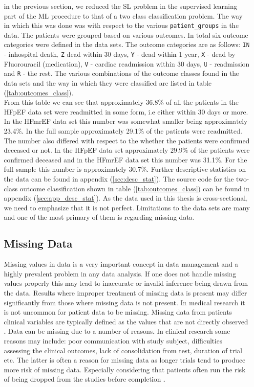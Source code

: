 \documentclass[../thesis.tex]{subfiles}
\begin{document}
\noindent in the previous section, we reduced the SL problem in the supervised learning part of the ML procedure to that of a two class classification problem. The way in which this was done was with respect to the various \texttt{patient\_groups} in the data. The patients were grouped based on various \noindent outcomes. In total six outcome categories were  defined in the data sets. The outcome categories are as follows: \texttt{IN} - inhospital death, \texttt{Z} \noindent dead within 30 days, \texttt{Y} - dead within 1 year, \texttt{X} - dead by Fluorouracil (medication), \texttt{V} - cardiac readmission within 30 days, \texttt{U} - readmission and \texttt{R} - the rest. The various combinations of the outcome classes found in the data sets and the way in which they were classified are listed in table (\ref{tab:outcomes_class}).\\
\indent From this table we can see that approximately 36.8\% of all the patients in the HFpEF data set were readmitted in some form, i.e either within 30 days or more. In the HFmrEF data set this number was somewhat smaller being approximately 23.4\%. In the full sample approximately 29.1\% of the patients were readmitted. The number also differed with respect to the whether the patients were confirmed deceased or not. In the HFpEF data set approximately 29.9\% of the patients were confirmed deceased and in the HFmrEF data set this number was 31.1\%. For the full sample this number is approximately 30.7\%. Further descriptive statistics on the data can be found in appendix (\ref{sec:desc_stat}). The source code for the two-class outcome classification shown in table (\ref{tab:outcomes_class}) can be found in appendix (\ref{sec:app_desc_stat}). As the data used in this thesis is cross-sectional, we need to emphasize that it is not perfect. Limitations to the data sets are many and one of the most primary of them is regarding missing data. 

\subsection{Missing Data}
\label{subsec:miss_data}

\noindent Missing values in data is a very important concept in data management and a highly prevalent problem in any data analysis. If one does not handle missing values properly this may lead to inaccurate or invalid inference being drawn from the data. Results where improper treatment of missing data is present may differ significantly from those where missing data is not present. In medical research it is not uncommon for patient data to be missing. Missing data from patients clinical variables are typically defined as the values that are not directly observed \citep{ibrahim2012missing}. Data can be missing due to a number of reasons. In clinical research some reasons may include: poor communication with study subject, difficulties assessing the clinical outcomes, lack of consolidation from test, duration of trial etc. The latter is often a reason for missing data as longer trials tend to produce more risk of missing data. Especially considering that patients often run the risk of being dropped from the studies before completion \citep{myers2000handling}.
\end{document}

